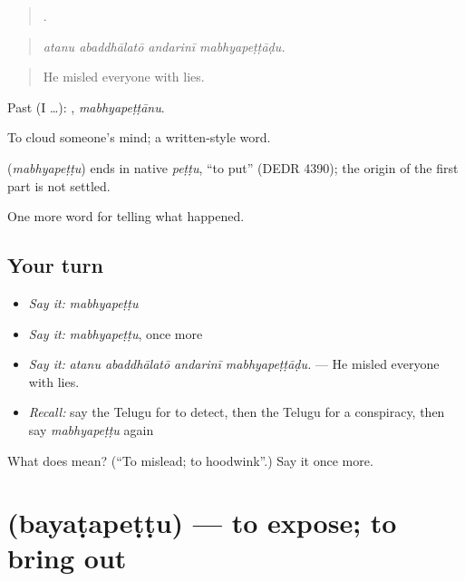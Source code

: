 \begin{quote}
   .
\end{quote}

\begin{quote}
\emph{atanu abaddhālatō andarinī mabhyapeṭṭāḍu.}
\end{quote}

\begin{quote}
He misled everyone with lies.
\end{quote}

Past (I …): , \emph{mabhyapeṭṭānu}.

To cloud someone's mind; a written-style word.

\begin{cousinweb}
\textbf{} (\emph{mabhyapeṭṭu}) ends in native \emph{peṭṭu}, \textquotedblleft{}to put\textquotedblright{} (DEDR 4390); the origin of the first part is not settled.
\end{cousinweb}

\begin{grammarlens}[title={What you've built}]
One more word for telling what happened.
\end{grammarlens}

\subsection*{Your turn}
\begin{itemize}
\raggedright
  \item \emph{Say it:} \emph{mabhyapeṭṭu}
  \item \emph{Say it:} \emph{mabhyapeṭṭu}, once more
  \item \emph{Say it:} \emph{atanu abaddhālatō andarinī mabhyapeṭṭāḍu.} — He misled everyone with lies.
  \item \emph{Recall:} say the Telugu for to detect, then the Telugu for a conspiracy, then say \emph{mabhyapeṭṭu} again
\end{itemize}

\begin{tcolorbox}[breakable,colback=teal!4,colframe=teal!35!black,title={Before you move on}]
What does  mean? (\textquotedblleft{}To mislead; to hoodwink\textquotedblright{}.) Say it once more.
\end{tcolorbox}
\section[\texorpdfstring{\te{బయటపెట్టు} (bayaṭapeṭṭu)}{బయటపెట్టు (bayaṭapeṭṭu)}]{ (bayaṭapeṭṭu) — to expose; to bring out}

